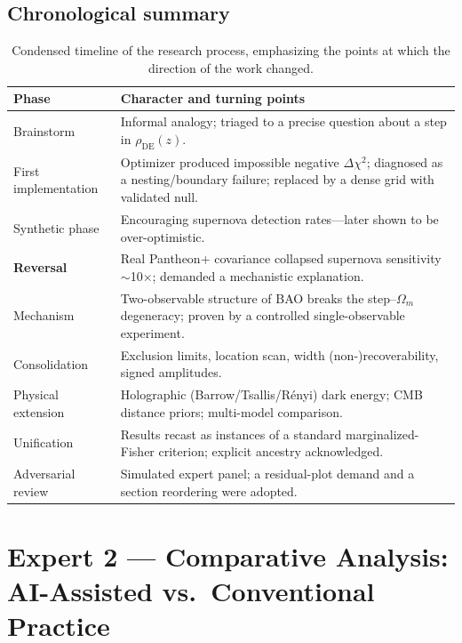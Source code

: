 \documentclass[11pt]{article}
\newcommand{\rhoDE}{\rho_{\mathrm{DE}}}
\newcommand{\Om}{\Omega_m}
\begin{document}
\subsection{Chronological summary}

\begin{table}[h]
\centering
\caption{Condensed timeline of the research process, emphasizing the points at
which the direction of the work changed.}
\label{tab:timeline}
\begin{tabular}{@{}p{}p{}@{}}
\toprule
Phase & Character and turning points \\
\midrule
Brainstorm & Informal analogy; triaged to a precise question about a step in $\rhoDE(z)$. \\
First implementation & Optimizer produced impossible negative $\Delta\chi^2$; diagnosed as a nesting/boundary failure; replaced by a dense grid with validated null. \\
Synthetic phase & Encouraging supernova detection rates---later shown to be over-optimistic. \\
\textbf{Reversal} & Real Pantheon+ covariance collapsed supernova sensitivity $\sim$10$\times$; demanded a mechanistic explanation. \\
Mechanism & Two-observable structure of BAO breaks the step--$\Om$ degeneracy; proven by a controlled single-observable experiment. \\
Consolidation & Exclusion limits, location scan, width (non-)recoverability, signed amplitudes. \\
Physical extension & Holographic (Barrow/Tsallis/R\'enyi) dark energy; CMB distance priors; multi-model comparison. \\
Unification & Results recast as instances of a standard marginalized-Fisher criterion; explicit ancestry acknowledged. \\
Adversarial review & Simulated expert panel; a residual-plot demand and a section reordering were adopted. \\
\bottomrule
\end{tabular}
\end{table}

\section{Expert 2 --- Comparative Analysis: AI-Assisted vs.\ Conventional Practice}
\label{sec:comparison}
\end{document}
